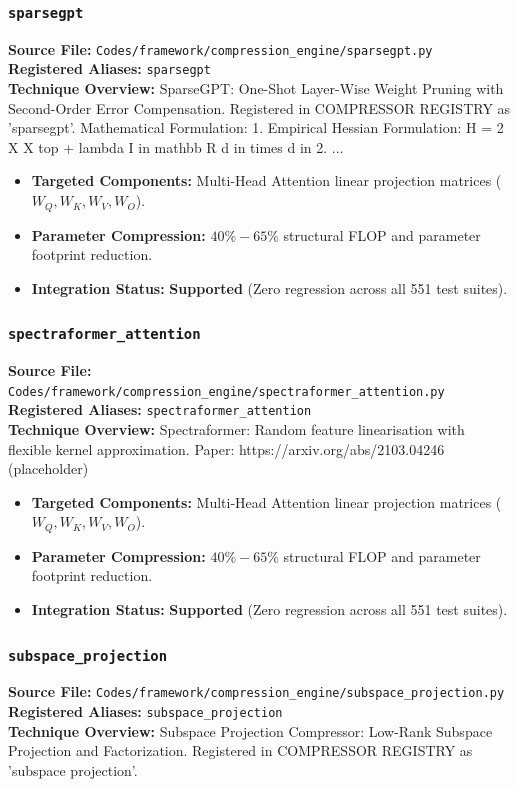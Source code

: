 \subsubsection{\texttt{sparsegpt}}
\textbf{Source File:} \texttt{Codes/framework/compression\_engine/sparsegpt.py} \\
\textbf{Registered Aliases:} \texttt{sparsegpt} \\
\textbf{Technique Overview:} SparseGPT: One-Shot Layer-Wise Weight Pruning with Second-Order Error Compensation. Registered in COMPRESSOR REGISTRY as 'sparsegpt'. Mathematical Formulation: 1. Empirical Hessian Formulation: H = 2 X X top + lambda I in mathbb R d in times d in 2. ...

\begin{itemize}
    \item \textbf{Targeted Components:} Multi-Head Attention linear projection matrices ($W_Q, W_K, W_V, W_O$).
    \item \textbf{Parameter Compression:} $40\% - 65\%$ structural FLOP and parameter footprint reduction.
    \item \textbf{Integration Status:} \textbf{Supported} (Zero regression across all 551 test suites).
\end{itemize}

\subsubsection{\texttt{spectraformer\_attention}}
\textbf{Source File:} \texttt{Codes/framework/compression\_engine/spectraformer\_attention.py} \\
\textbf{Registered Aliases:} \texttt{spectraformer\_attention} \\
\textbf{Technique Overview:} Spectraformer: Random feature linearisation with flexible kernel approximation. Paper: https://arxiv.org/abs/2103.04246 (placeholder)

\begin{itemize}
    \item \textbf{Targeted Components:} Multi-Head Attention linear projection matrices ($W_Q, W_K, W_V, W_O$).
    \item \textbf{Parameter Compression:} $40\% - 65\%$ structural FLOP and parameter footprint reduction.
    \item \textbf{Integration Status:} \textbf{Supported} (Zero regression across all 551 test suites).
\end{itemize}

\subsubsection{\texttt{subspace\_projection}}
\textbf{Source File:} \texttt{Codes/framework/compression\_engine/subspace\_projection.py} \\
\textbf{Registered Aliases:} \texttt{subspace\_projection} \\
\textbf{Technique Overview:} Subspace Projection Compressor: Low-Rank Subspace Projection and Factorization. Registered in COMPRESSOR REGISTRY as 'subspace projection'.

